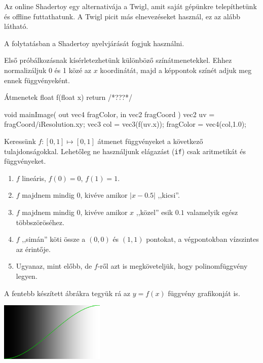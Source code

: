 Az online Shadertoy egy alternativája a Twigl, amit saját gépünkre telepíthetünk és offline futtathatunk.
A Twigl picit más elnevezéseket használ, ez az alább látható.

  
A folytatásban a Shadertoy nyelvjárását fogjuk használni. 

\matfeladatok

Első próbálkozásnak kísérletezhetünk különböző színátmenetekkel. Ehhez normalizáljuk 0 és 1 közé
az $x$ koordinátát, majd a képpontok színét adjuk meg ennek függvényeként.

\begin{glsl}{Átmenetek}
float f(float x) { return /*???*/ }
    
void mainImage( out vec4 fragColor, in vec2 fragCoord )
{
  vec2 uv = fragCoord/iResolution.xy;
  vec3 col = vec3(f(uv.x));
  fragColor = vec4(col,1.0);
}
\end{glsl}

Keressünk $f: [0, 1] \mapsto [0,1]$ átmenet függvényeket a következő tulajdonságokkal.
Lehetőleg ne használjunk elágazást (\texttt{if}) csak aritmetikát és függvényeket.

\begin{enumerate}[resume]
  \item $f$ lineáris, $f(0)=0$, $f(1)=1$.
  \item $f$ majdnem mindig 0, kivéve amikor $|x-0.5|$ ,,kicsi''.
  \item $f$ majdnem mindig 0, kivéve amikor $x$ ,,közel'' esik $0.1$ valamelyik egész többszöröséhez.
  \item $f$ ,,simán'' köti össze a $(0,0)$ és $(1,1)$ pontokat, a végpontokban vízszintes az érintője.
  \item Ugyanaz, mint előbb, de $f$-ről azt is megköveteljük, hogy polinomfüggvény legyen. 
\end{enumerate}

A fentebb készített ábrákra tegyük rá az $y=f(x)$ függvény grafikonját is.

\includegraphics[width=5cm]{images/fv.png}


